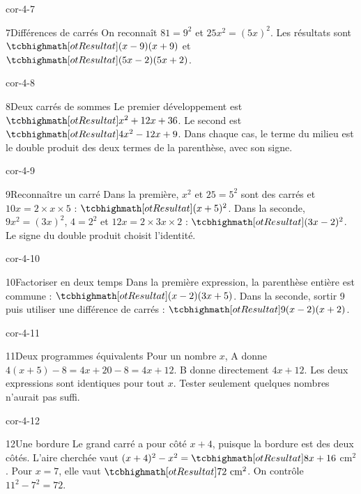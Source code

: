 \begin{blocLivre}{cor-4-7}\begin{corrige}{7}{Différences de carrés}
On reconnaît $81=9^2$ et $25x^2=(5x)^2$. Les résultats sont $\res{(x-9)(x+9)}$ et $\res{(5x-2)(5x+2)}$.
\end{corrige}\end{blocLivre}
\begin{blocLivre}{cor-4-8}\begin{corrige}{8}{Deux carrés de sommes}
Le premier développement est $\res{x^2+12x+36}$. Le second est $\res{4x^2-12x+9}$. Dans chaque cas, le terme du milieu est le double produit des deux termes de la parenthèse, avec son signe.
\end{corrige}\end{blocLivre}
\begin{blocLivre}{cor-4-9}\begin{corrige}{9}{Reconnaître un carré}
Dans la première, $x^2$ et $25=5^2$ sont des carrés et $10x=2\times x\times5$ : $\res{(x+5)^2}$. Dans la seconde, $9x^2=(3x)^2$, $4=2^2$ et $12x=2\times3x\times2$ : $\res{(3x-2)^2}$. Le signe du double produit choisit l’identité.
\end{corrige}\end{blocLivre}
\begin{blocLivre}{cor-4-10}\begin{corrige}{10}{Factoriser en deux temps}
Dans la première expression, la parenthèse entière est commune : $\res{(x-2)(3x+5)}$. Dans la seconde, sortir 9 puis utiliser une différence de carrés : $\res{9(x-2)(x+2)}$.
\end{corrige}\end{blocLivre}
\begin{blocLivre}{cor-4-11}\begin{corrige}{11}{Deux programmes équivalents}
Pour un nombre $x$, A donne $4(x+5)-8=4x+20-8=4x+12$. B donne directement $4x+12$. Les deux expressions sont identiques pour tout $x$. Tester seulement quelques nombres n’aurait pas suffi.
\end{corrige}\end{blocLivre}
\begin{blocLivre}{cor-4-12}\begin{corrige}{12}{Une bordure}
Le grand carré a pour côté $x+4$, puisque la bordure est des deux côtés. L’aire cherchée vaut $(x+4)^2-x^2=\res{8x+16}$ cm$^2$. Pour $x=7$, elle vaut $\res{72\text{ cm}^2}$. On contrôle $11^2-7^2=72$.
\label{fig-cor-4-12}
\end{corrige}\end{blocLivre}
